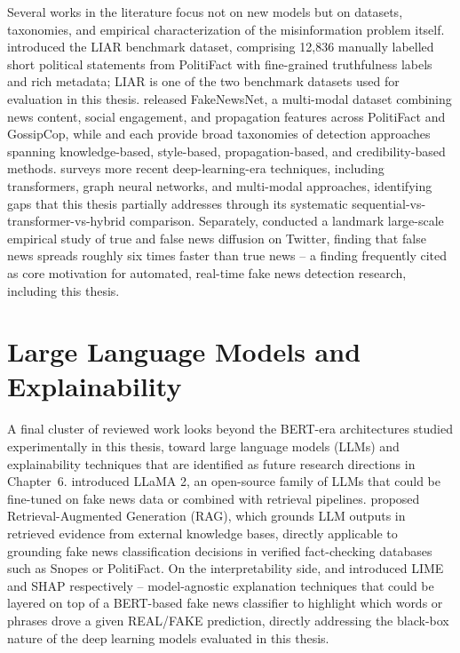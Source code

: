 Several works in the literature focus not on new models but on datasets, taxonomies, and empirical characterization of the misinformation problem itself. \citet{Wang2017Liar} introduced the LIAR benchmark dataset, comprising 12,836 manually labelled short political statements from PolitiFact with fine-grained truthfulness labels and rich metadata; LIAR is one of the two benchmark datasets used for evaluation in this thesis. \citet{Shu2020FakeNewsNet} released FakeNewsNet, a multi-modal dataset combining news content, social engagement, and propagation features across PolitiFact and GossipCop, while \citet{Shu2017FakeNewsDetection} and \citet{Zhou2020Survey} each provide broad taxonomies of detection approaches spanning knowledge-based, style-based, propagation-based, and credibility-based methods. \citet{Mehta2022RecentTrends} surveys more recent deep-learning-era techniques, including transformers, graph neural networks, and multi-modal approaches, identifying gaps that this thesis partially addresses through its systematic sequential-vs-transformer-vs-hybrid comparison. Separately, \citet{Vosoughi2018Spread} conducted a landmark large-scale empirical study of true and false news diffusion on Twitter, finding that false news spreads roughly six times faster than true news -- a finding frequently cited as core motivation for automated, real-time fake news detection research, including this thesis.

\section{Large Language Models and Explainability}

A final cluster of reviewed work looks beyond the BERT-era architectures studied experimentally in this thesis, toward large language models (LLMs) and explainability techniques that are identified as future research directions in Chapter~6. \citet{Touvron2023Llama2} introduced LLaMA 2, an open-source family of LLMs that could be fine-tuned on fake news data or combined with retrieval pipelines. \citet{Lewis2020RAG} proposed Retrieval-Augmented Generation (RAG), which grounds LLM outputs in retrieved evidence from external knowledge bases, directly applicable to grounding fake news classification decisions in verified fact-checking databases such as Snopes or PolitiFact. On the interpretability side, \citet{Ribeiro2016LIME} and \citet{Lundberg2017SHAP} introduced LIME and SHAP respectively -- model-agnostic explanation techniques that could be layered on top of a BERT-based fake news classifier to highlight which words or phrases drove a given REAL/FAKE prediction, directly addressing the black-box nature of the deep learning models evaluated in this thesis.

